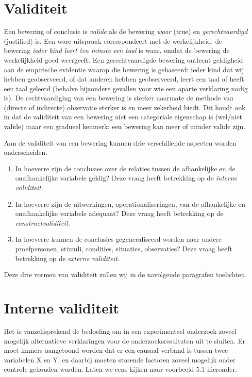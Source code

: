 \documentclass[
]{book}
\begin{document}
\section{Validiteit}\label{sec:validiteit}

Een bewering of conclusie is \emph{valide} als de bewering \emph{waar} (true) en
\emph{gerechtvaardigd} (justified) is. Een ware uitspraak correspondeert met
de werkelijkheid: de bewering \emph{ieder kind leert ten minste een taal} is
waar, omdat de bewering de werkelijkheid goed weergeeft. Een
gerechtvaardigde bewering ontleent geldigheid aan de empirische
evidentie waarop die bewering is gebaseerd: ieder kind dat wij hebben
geobserveerd, of dat anderen hebben geobserveerd, leert een taal of
heeft een taal geleerd (behalve bijzondere gevallen voor wie een aparte
verklaring nodig is). De rechtvaardiging van een bewering is sterker
naarmate de methode van (directe of indirecte) observatie sterker is en
meer zekerheid biedt. Dit houdt ook in dat de validiteit van een
bewering niet een categoriale eigenschap is (wel/niet valide) maar een
gradueel kenmerk: een bewering kan meer of minder valide zijn.

Aan de validiteit van een bewering kunnen drie verschillende aspecten
worden onderscheiden.

\begin{enumerate}
\def\labelenumi{\arabic{enumi}.}
\item
  In hoeverre zijn de conclusies over de relaties tussen de
  afhankelijke en de onafhankelijke variabele geldig? Deze vraag heeft
  betrekking op de \emph{interne validiteit}.
\item
  In hoeverre zijn de uitwerkingen, operationaliseringen, van de
  afhankelijke en onafhankelijke variabele adequaat? Deze vraag heeft
  betrekking op de \emph{constructvaliditeit}.
\item
  In hoeverre kunnen de conclusies gegeneraliseerd worden naar andere
  proefpersonen, stimuli, condities, situaties, observaties? Deze
  vraag heeft betrekking op de \emph{externe validiteit}.
\end{enumerate}

Deze drie vormen van validiteit zullen wij in de navolgende paragrafen
toelichten.

\section{Interne validiteit}\label{sec:internevaliditeit}

Het is vanzelfsprekend de bedoeling om in een experimenteel onderzoek
zoveel mogelijk alternatieve verklaringen voor de onderzoeksresultaten
uit te sluiten. Er moet immers aangetoond worden dat er een causaal
verband is tussen twee variabelen X en Y, en daarbij moeten storende
factoren zoveel mogelijk onder controle gehouden worden. Laten we eens
kijken naar voorbeeld 5.1 hieronder.
\end{document}

